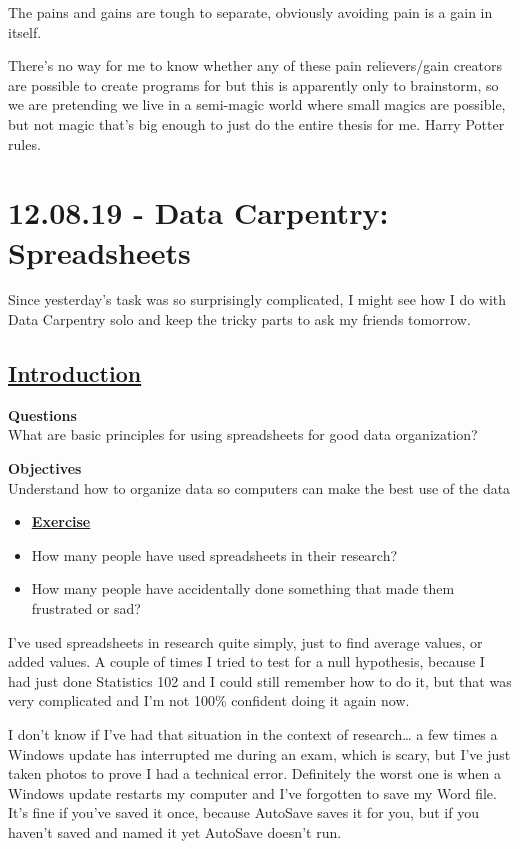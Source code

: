 \documentclass[12pt]{article}
\begin{document}
The pains and gains are tough to separate, obviously avoiding pain is a gain in itself.

There's no way for me to know whether any of these pain relievers/gain creators are possible to create programs for but this is apparently only to brainstorm, so we are pretending we live in a semi-magic world where small magics are possible, but not magic that's big enough to just do the entire thesis for me. Harry Potter rules.

\newpage
\section{12.08.19 - Data Carpentry: Spreadsheets}
Since yesterday’s task was so surprisingly complicated, I might see how I do with Data Carpentry solo and keep the tricky parts to ask my friends tomorrow.

\subsection{\textbf{\href{https://datacarpentry.org/spreadsheets-socialsci/00-intro/index.html}{\textbf{Introduction}}}}
\setlength{\parskip}{0.5em}


\color{Gray}\textbf{Questions}
\\What are basic principles for using spreadsheets for good data organization?

\textbf{Objectives}
\\Understand how to organize data so computers can make the best use of the data

\begin{itemize}
\renewcommand{\labelitemi}{}
\item \textbf{\underline{Exercise}}
\renewcommand{\labelitemi}{$\bullet$}
    \item How many people have used spreadsheets in their research?
    \item How many people have accidentally done something that made them frustrated or sad?
\end{itemize}\color{black}

I’ve used spreadsheets in research quite simply, just to find average values, or added values. A couple of times I tried to test for a null hypothesis, because I had just done Statistics 102 and I could still remember how to do it, but that was very complicated and I’m not 100\% confident doing it again now.

I don’t know if I’ve had that situation in the context of research… a few times a Windows update has interrupted me during an exam, which is scary, but I’ve just taken photos to prove I had a technical error. Definitely the worst one is when a Windows update restarts my computer and I’ve forgotten to save my Word file. It’s fine if you’ve saved it once, because AutoSave saves it for you, but if you haven’t saved and named it yet AutoSave doesn’t run.
\end{document}
